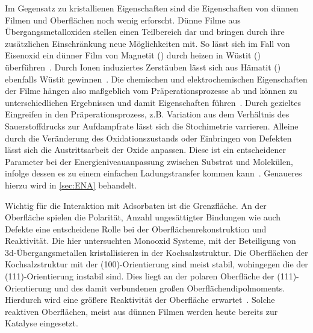         Im Gegensatz zu kristallienen Eigenschaften sind die Eigenschaften von dünnen Filmen und Oberflächen noch wenig erforscht.
        Dünne Filme aus Übergangsmetalloxiden stellen einen Teilbereich dar und bringen durch ihre zusätzlichen Einschränkung neue Möglichkeiten mit.
        So lässt sich im Fall von Eisenoxid ein dünner Film von Magnetit () durch heizen in Wüstit () überführen~\cite{FeO_1}.
        Durch Ionen induziertes Zerstäuben lässt sich aus Hämatit () ebenfalls Wüstit gewinnen~\cite{FeO_36}.
        Die chemischen und elektrochemischen Eigenschaften der Filme hängen also maßgeblich vom Präperationsprozesse ab und können zu unterschiedlichen Ergebnissen und damit Eigenschaften führen~\cite{Uni-Tübingen}.
        Durch gezieltes Eingreifen in den Präperationsprozess, z.B. Variation aus dem Verhältnis des Sauerstoffdrucks zur Aufdampfrate lässt sich die Stochimetrie varrieren.
        Alleine durch die Veränderung des Oxidationszustands oder Einbringen von Defekten lässt sich die Austrittsarbeit der Oxide anpassen.
        Diese ist ein entscheidener Parameter bei der Energieniveauanpassung zwischen Substrat und Molekülen, infolge dessen es zu einem einfachen Ladungstransfer kommen kann~\cite{IF_3}.
        Genaueres hierzu wird in \autoref{sec:ENA} behandelt.

        Wichtig für die Interaktion mit Adsorbaten ist die Grenzfläche.
        An der Oberfläche spielen die Polarität, Anzahl ungesättigter Bindungen wie auch Defekte eine entscheidene Rolle bei der Oberflächenrekonstruktion und Reaktivität.
        Die hier untersuchten Monooxid Systeme, mit der Beteiligung von 3d-Übergangsmetallen kristallisieren in der Kochsalzstruktur.
        Die Oberflächen der Kochsalzstruktur mit der (100)-Orientierung sind meist stabil, wohingegen die der (111)-Orientierung instabil sind.
        Dies liegt an der polaren Oberfläche der (111)-Orientierung und des damit verbundenen großen Oberflächendipolmoments.
        Hierdurch wird eine größere Reaktivität der Oberfläche erwartet~\cite{cappus_hydroxyl_1993}.
        Solche reaktiven Oberflächen, meist aus dünnen Filmen werden heute bereits zur Katalyse eingesetzt.

